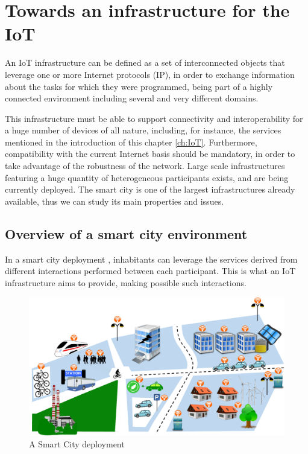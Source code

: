 \section{Towards an infrastructure for the IoT}
\label{sec:IoTInfra}
An IoT infrastructure can be defined as a set of interconnected objects that leverage one or more Internet protocols (IP), in order to exchange information about the tasks for which they were programmed, being part of a highly connected environment including several and very different domains.

This infrastructure must be able to support connectivity and interoperability for a huge number of devices of all nature, including, for instance, the services mentioned in the introduction of this chapter \ref{ch:IoT}.
Furthermore, compatibility with the current Internet basis should be mandatory, in order to take advantage of the robustness of the network.
Large scale infrastructures featuring a huge quantity of heterogeneous participants exists, and are being currently deployed.
The smart city is one of the largest infrastructures already available, thus we can study its main properties and issues.



\subsection{Overview of a smart city environment}
\label{sec:SmartCityEnv}
In a smart city deployment \cite{smartsantander}, inhabitants can leverage the services derived from different interactions performed between each participant.
This is what an IoT infrastructure aims to provide, making possible such interactions.

\begin{figure}[htb]
	\centering
	\includegraphics[width=1\columnwidth]{chapters/background.images/SmartCity_comm.pdf}
	\caption{A Smart City deployment}
	\label{fig:SmartCity}
\end{figure}

